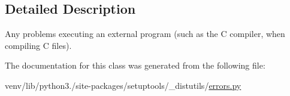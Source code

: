 \subsection{Detailed Description}
\begin{DoxyVerb}Any problems executing an external program (such as the C
compiler, when compiling C files).\end{DoxyVerb}
 

The documentation for this class was generated from the following file\+:\begin{DoxyCompactItemize}
\item 
venv/lib/python3./site-\/packages/setuptools/\+\_\+distutils/\hyperlink{__distutils_2errors_8py}{errors.\+py}\end{DoxyCompactItemize}

